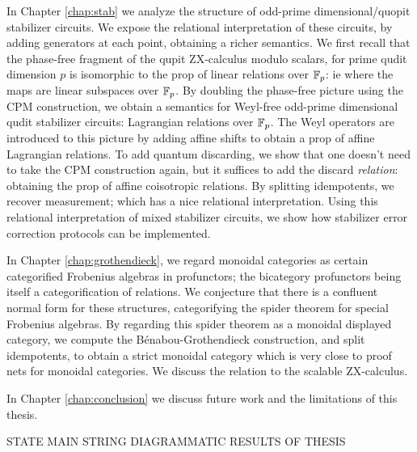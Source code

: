 In Chapter \ref{chap:stab}  we analyze the structure of odd-prime dimensional/quopit stabilizer circuits.
We expose the relational interpretation of these circuits, by adding generators at each point, obtaining a richer semantics.  We first recall that the phase-free fragment of the qupit ZX-calculus modulo scalars, for prime qudit dimension $p$ is isomorphic to the prop of linear relations over $\mathbb{F}_p$: ie where the maps are linear subspaces over $\mathbb{F}_p$.  By doubling the phase-free picture using the CPM construction, we obtain a semantics for Weyl-free odd-prime dimensional qudit stabilizer circuits: Lagrangian relations over $\mathbb{F}_p$.  The Weyl operators are introduced to this picture by adding affine shifts to obtain a prop of affine Lagrangian relations. To add quantum discarding, we show that one doesn't need to take the CPM construction again, but it suffices to add the discard {\em relation}:   obtaining the prop of affine coisotropic relations.  By splitting idempotents, we recover measurement; which has a nice relational interpretation.  Using this relational interpretation of mixed stabilizer circuits, we show how stabilizer error correction protocols can be implemented.


In Chapter \ref{chap:grothendieck}, we regard monoidal categories as certain categorified Frobenius algebras in profunctors; the bicategory profunctors being itself a categorification of relations.  We conjecture that there is a confluent normal form for these structures, categorifying the spider theorem for special Frobenius algebras.  By regarding this spider theorem as a monoidal displayed category, we compute the B\'enabou-Grothendieck construction, and split idempotents, to obtain a strict monoidal category which is very close to proof nets for monoidal categories. We discuss the relation to the scalable ZX-calculus.

In Chapter \ref{chap:conclusion} we discuss future work and the limitations of this thesis.



STATE MAIN STRING DIAGRAMMATIC RESULTS OF THESIS

